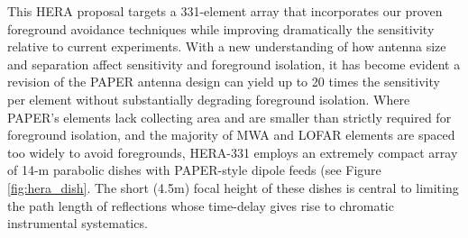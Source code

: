 \documentclass[preprint]{aastex}
\begin{document}




This HERA proposal targets a 331-element array that incorporates
our proven foreground avoidance techniques while improving
dramatically the sensitivity relative to current experiments.  With a
new understanding of how antenna size and separation affect
sensitivity and foreground isolation, it has become evident a revision
of the PAPER antenna design can yield up to 20 times the sensitivity
per element without substantially degrading foreground isolation.
Where PAPER's elements lack collecting area and are smaller than
strictly required for foreground isolation, and the majority of MWA
and LOFAR elements are spaced too widely to avoid foregrounds,
HERA-331 employs an extremely compact array of 14-m parabolic dishes
with PAPER-style dipole feeds (see Figure \ref{fig:hera_dish}.  The
short (4.5m) focal height of these dishes is central to limiting the
path length of reflections whose time-delay gives rise to chromatic
instrumental systematics.
\end{document}
